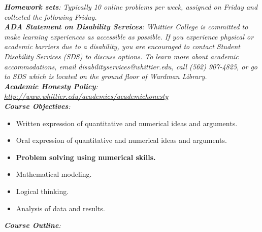 \documentclass[10pt]{article}
\begin{document}
\textit{\textbf{Homework sets}: Typically 10 online problems per week, assigned on Friday and collected the following Friday.} \\
\textit{\textbf{ADA Statement on Disability Services}: Whittier College is committed to make learning experiences as accessible as possible. If you experience physical or academic barriers due to a disability, you are encouraged to contact Student Disability Services (SDS) to discuss options. To learn more about academic accommodations, email disabilityservices@whittier.edu, call (562) 907-4825, or go to SDS which is located on the ground floor of Wardman Library.} \\
\textit{\textbf{Academic Honesty Policy}: \url{http://www.whittier.edu/academics/academichonesty}} \\
\textit{\textbf{Course Objectives}:}
\begin{itemize}
\item Written expression of quantitative and numerical ideas and arguments.
\item Oral expression of quantitative and numerical ideas and arguments.
\item \textbf{Problem solving using numerical skills.}
\item Mathematical modeling.
\item Logical thinking.
\item Analysis of data and results.
\end{itemize}
\textit{\textbf{Course Outline}:}
\end{document}
